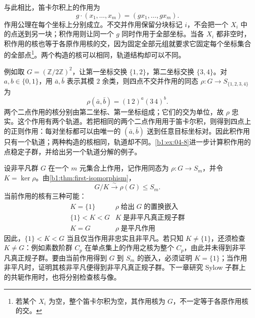 \ProseParagraphBreak
与此相比，笛卡尔积上的作用为
\[
	g\cdot(x_1,\ldots,x_m)=(gx_1,\ldots,gx_m).
\]
作用公理在每个坐标上分别成立。不交并作用保留分块标记 \(i\)，不会把一个 \(X_i\) 中的点送到另一块；积作用则让同一个 \(g\) 同时作用于全部坐标。当各 \(X_i\) 都非空时，积作用的核也等于各原作用核的交，因为固定全部元组就要求它固定每个坐标集合的全部点\footnote{若某个 \(X_i\) 为空，整个笛卡尔积为空，其作用核为 \(G\)，不一定等于各原作用核的交。}。两个构造的核可以相同，轨道结构却可以不同。

\ProseParagraphBreak
例如取 \(G=(\mathbb Z/2\mathbb Z)^2\)，让第一坐标交换 \(\{1,2\}\)，第二坐标交换 \(\{3,4\}\)。对 \(a,b\in\{0,1\}\)，用 \(\bar a,\bar b\) 表示其模 \(2\) 余类，则四点不交并作用的同态 \(\rho:G\rightarrow S_{\{1,2,3,4\}}\) 为
\[
	\rho(\bar a,\bar b)=(1\,2)^a(3\,4)^b.
\]
两个二点作用的核分别由第二坐标、第一坐标组成；它们的交为单位，故 \(\rho\) 忠实。这个作用有两个轨道。若把相同的两个二点作用用于笛卡尔积，则得到四点上的正则作用：每对坐标都可以由唯一的 \((\bar a,\bar b)\) 送到任意目标坐标对。因此积作用只有一个轨道；两种构造的核相同，轨道却不同。\cref{b1:ex:04-8}进一步计算积作用的点稳定子群，并给出另一个轨道分解的例子。

\begin{remark}\label{b1:rem:action-structural-use}
	设非平凡群 \(G\) 在一个 \(m\) 元集合上作用，记作用同态为 \(\rho:G\rightarrow S_m\)，并令 \(K=\ker\rho\)。由\cref{b1:thm:first-isomorphism}，
	\[
		G/K\xrightarrow{\sim}\rho(G)\leq S_m.
	\]
	当前作用的核有三种可能：
	\[
		\begin{array}{c|l}
			K=\{1\} & \rho\;\text{给出}\;G\;\text{的置换嵌入}\\
			\{1\}<K<G & K\;\text{是非平凡真正规子群}\\
			K=G & \rho\;\text{是平凡作用}
		\end{array}
	\]
	因此，\(\{1\}<K<G\) 当且仅当作用非忠实且非平凡。若只知 \(K\ne\{1\}\)，还须检查 \(K\ne G\)：例如素数阶群 \(C_p\) 在单点集上的作用之核为整个 \(C_p\)，由此并未得到非平凡真正规子群。要由当前作用得到 \(G\) 到 \(S_m\) 的嵌入，必须证明 \(K=\{1\}\)；当作用非平凡时，证明其核非平凡便得到非平凡真正规子群。下一章研究 Sylow 子群上的共轭作用时，也将分别检查核与像。
\end{remark}
